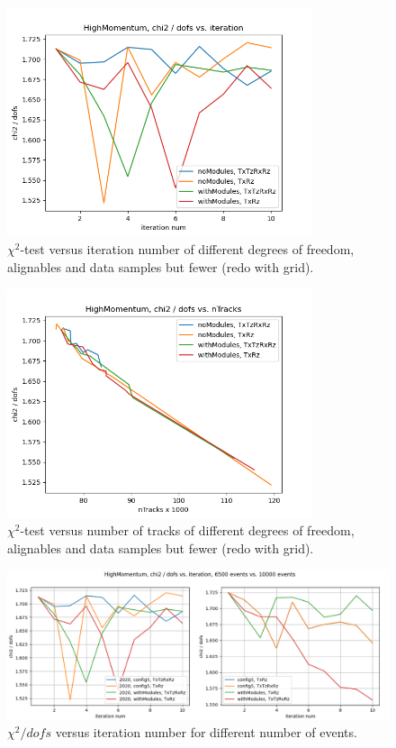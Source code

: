 \begin{figure}
  \centering
  \includegraphics[width=0.8\textwidth]{plots/nov_21/chi2_vs_iter_all.png}
  \caption{$\chi^2$-test versus iteration number of different degrees of freedom, alignables and data samples but fewer (redo with grid).}
  \label{fig:chi2iter}
\end{figure}

\begin{figure}
  \centering
  \includegraphics[width=0.8\textwidth]{plots/nov_21/chi2_vs_ntracks_all.png}
  \caption{$\chi^2$-test versus number of tracks of different degrees of freedom, alignables and data samples but fewer (redo with grid).}
  \label{fig:chi2tracks}
\end{figure}

\begin{figure}
  \centering
  \includegraphics[width=\textwidth]{plots/LHCB_week_dec/chi2_vs_iter_normal.png}
  \caption{$\chi^2 / dofs$ versus iteration number for different number of events.}
  \label{fig:chi2iterdec}
\end{figure}

